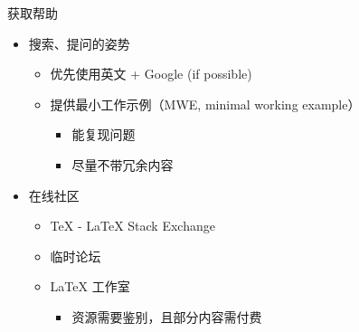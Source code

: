 \begin{frame}{获取帮助}
\begin{itemize}
  \item<+-> 搜索、提问的姿势

  \begin{itemize}
    \item 优先使用英文 + Google (if possible)
    \item 提供最小工作示例（MWE, minimal working example）
      \begin{itemize}
        \item 能复现问题
        \item 尽量不带冗余内容
      \end{itemize}
  \end{itemize}

  \item<+-> 在线社区

  \begin{itemize}
    \item \TeX{} - \LaTeX{} Stack Exchange 
    \item \CTeX{} 临时论坛 
    \item \LaTeX{} 工作室 
      \begin{itemize}
        \item 资源需要鉴别，且部分内容需付费
      \end{itemize}
  \end{itemize}
\end{itemize}
\end{frame}


